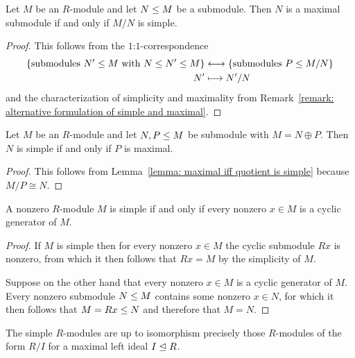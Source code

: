 \begin{lemma}
  \label{lemma: maximal iff quotient is simple}
  Let $M$ be an $R$-module and let $N \leq M$ be a submodule.
  Then $N$ is a maximal submodule if and only if $M/N$ is simple.
\end{lemma}


\begin{proof}
  This follows from the $1$:$1$-correspondence
  \begin{align*}
    \{ \text{submodules $N' \leq M$ with $N \leq N' \leq M$} \}
    &\longleftrightarrow
    \{ \text{submodules $P \leq M/N$} \}
    \\
                  N'
    &\longmapsto  N'/N
  \end{align*}
  and the characterization of simplicity and maximality from Remark~\ref{remark: alternative formulation of simple and maximal}.
\end{proof}


\begin{corollary}
  Let $M$ be an $R$-module and let $N, P \leq M$ be submodule with $M = N \oplus P$.
  Then $N$ is simple if and only if $P$ is maximal.
\end{corollary}


\begin{proof}
  This follows from Lemma~\ref{lemma: maximal iff quotient is simple} because $M/P \cong N$.
\end{proof}


\begin{lemma}
  \label{lemma: simple iff every cyclic generator}
  A nonzero $R$-module $M$ is simple if and only if every nonzero $x \in M$ is a cyclic generator of $M$. 
\end{lemma}


\begin{proof}
  If $M$ is simple then for every nonzero $x \in M$ the cyclic submodule $Rx$ is nonzero, from which it then follows that $Rx = M$ by the simplicity of $M$.
  
  Suppose on the other hand that every nonzero $x \in M$ is a cyclic generator of $M$.
  Every nonzero submodule $N \leq M$ contains some nonzero $x \in N$, for which it then follows that $M = Rx \leq N$ and therefore that $M = N$.
\end{proof}


\begin{corollary}
  \label{corollary: simple modules are quotients by maximal ideals}
  The simple $R$-modules are up to isomorphism precisely those $R$-modules of the form $R/I$ for a maximal left ideal $I \trianglelefteq R$.
\end{corollary}


